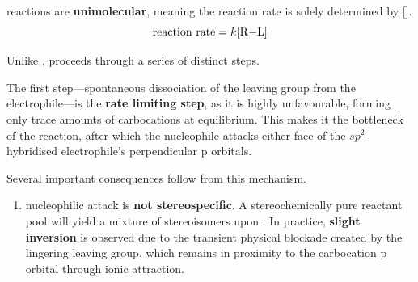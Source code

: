 \documentclass[10pt]{article}
\begin{document}
    \begin{core}{\sno}

      \sno reactions are \textbf{unimolecular}, meaning the reaction rate is solely determined by [].
      \[
        \text{reaction rate} = k[\ce{R-L}]
      \]

      Unlike \snt, \sno proceeds through a series of distinct steps.
      

      The first step---spontaneous dissociation of the leaving group from the electrophile---is the \textbf{rate limiting step}, as it is highly unfavourable, forming only trace amounts of carbocations at equilibrium. This makes it the bottleneck of the reaction, after which the nucleophile attacks either face of the $sp^2$-hybridised electrophile's perpendicular p orbitals.

      Several important consequences follow from this mechanism.

      \begin{enumerate}

        \item \sno nucleophilic attack is \textbf{not stereospecific}. A stereochemically pure reactant pool will yield a mixture of stereoisomers upon \sno. In practice, \textbf{slight inversion} is observed due to the transient physical blockade created by the lingering leaving group, which remains in proximity to the carbocation p orbital through ionic attraction.


\end{enumerate}
\end{core}
\end{document}
